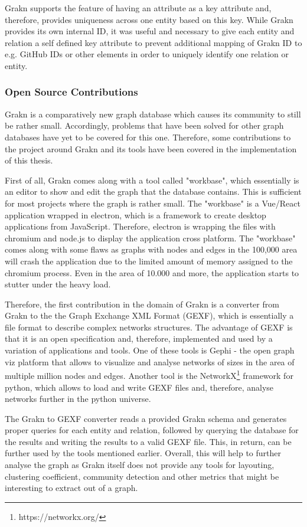 Grakn supports the feature of having an attribute as a key attribute and, therefore, provides uniqueness across one entity based on this key. While Grakn provides its own internal ID, it was useful and necessary to give each entity and relation a self defined key attribute to prevent additional mapping of Grakn ID to e.g. GitHub IDs or other elements in order to uniquely identify one relation or entity.

\subsubsection{Open Source Contributions}
\label{sec:opensource}
Grakn is a comparatively new graph database which causes its community to still be rather small. Accordingly, problems that have been solved for other graph databases have yet to be covered for this one. Therefore, some contributions to the project around Grakn and its tools have been covered in the implementation of this thesis.

First of all, Grakn comes along with a tool called "workbase", which essentially is an editor to show and edit the graph that the database contains. This is sufficient for most projects where the graph is rather small. The "workbase" is a Vue/React application wrapped in electron, which is a framework to create desktop applications from JavaScript. Therefore, electron is wrapping the files with chromium and node.js to display the application cross platform. The "workbase" comes along with some flaws as graphs with nodes and edges in the 100,000 area will crash the application due to the limited amount of memory assigned to the chromium process. Even in the area of 10.000 and more, the application starts to stutter under the heavy load.

Therefore, the first contribution in the domain of Grakn is a converter from Grakn to the the Graph Exchange XML Format (GEXF), which is essentially a file format to describe complex networks structures.
The advantage of GEXF is that it is an open specification and, therefore, implemented and used by a variation of applications and tools. One of these tools is Gephi - the open graph viz platform that allows to visualize and analyse networks of sizes in the area of multiple million nodes and edges. Another tool is the NetworkX\footnote{https://networkx.org/} framework for python, which allows to load and write GEXF files and, therefore, analyse networks further in the python universe.

The Grakn to GEXF converter reads a provided Grakn schema and generates proper queries for each entity and relation, followed by querying the database for the results and writing the results to a valid GEXF file. This, in return, can be further used by the tools mentioned earlier. Overall, this will help to further analyse the graph as Grakn itself does not provide any tools for layouting, clustering coefficient, community detection and other metrics that might be interesting to extract out of a graph.

